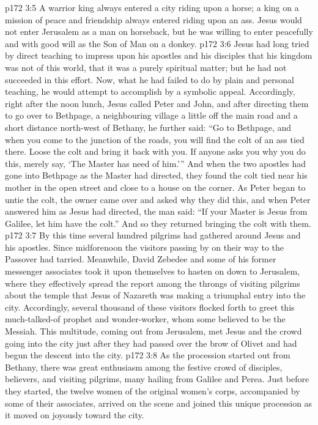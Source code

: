\vs p172 3:5 \pc A warrior king always entered a city riding upon a horse; a king on a mission of peace and friendship always entered riding upon an ass. Jesus would not enter Jerusalem as a man on horseback, but he was willing to enter peacefully and with good will as the Son of Man on a donkey.
\vs p172 3:6 \pc Jesus had long tried by direct teaching to impress upon his apostles and his disciples that his kingdom was not of this world, that it was a purely spiritual matter; but he had not succeeded in this effort. Now, what he had failed to do by plain and personal teaching, he would attempt to accomplish by a symbolic appeal. Accordingly, right after the noon lunch, Jesus called Peter and John, and after directing them to go over to Bethpage, a neighbouring village a little off the main road and a short distance north\hyp{}west of Bethany, he further said: “Go to Bethpage, and when you come to the junction of the roads, you will find the colt of an ass tied there. Loose the colt and bring it back with you. If anyone asks you why you do this, merely say, ‘The Master has need of him.’” And when the two apostles had gone into Bethpage as the Master had directed, they found the colt tied near his mother in the open street and close to a house on the corner. As Peter began to untie the colt, the owner came over and asked why they did this, and when Peter answered him as Jesus had directed, the man said: “If your Master is Jesus from Galilee, let him have the colt.” And so they returned bringing the colt with them.
\vs p172 3:7 By this time several hundred pilgrims had gathered around Jesus and his apostles. Since midforenoon the visitors passing by on their way to the Passover had tarried. Meanwhile, David Zebedee and some of his former messenger associates took it upon themselves to hasten on down to Jerusalem, where they effectively spread the report among the throngs of visiting pilgrims about the temple that Jesus of Nazareth was making a triumphal entry into the city. Accordingly, several thousand of these visitors flocked forth to greet this much\hyp{}talked\hyp{}of prophet and wonder\hyp{}worker, whom some believed to be the Messiah. This multitude, coming out from Jerusalem, met Jesus and the crowd going into the city just after they had passed over the brow of Olivet and had begun the descent into the city.
\vs p172 3:8 As the procession started out from Bethany, there was great enthusiasm among the festive crowd of disciples, believers, and visiting pilgrims, many hailing from Galilee and Perea. Just before they started, the twelve women of the original women’s corps, accompanied by some of their associates, arrived on the scene and joined this unique procession as it moved on joyously toward the city.

